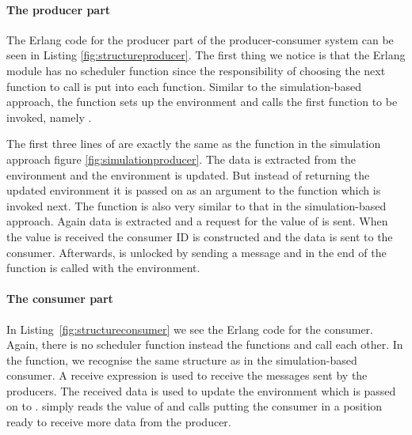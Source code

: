 \paragraph{The producer part}
The Erlang code for the producer part of the producer-consumer system can be seen in Listing \ref{fig:structureproducer}. The first thing we notice is that the Erlang module has no scheduler function since the responsibility of choosing the next function to call is put into each function. Similar to the simulation-based approach, the  function sets up the environment and calls the first function to be invoked, namely .



The first three lines of  are exactly the same as the  function in the simulation approach figure \ref{fig:simulationproducer}. The data is extracted from the environment and the environment is updated. But instead of returning the updated environment it is passed on as an argument to the  function which is invoked next. The  function is also very similar to that in the simulation-based approach. Again data is extracted and a request for the value of  is sent. When the value is received the consumer ID is constructed and the data is sent to the consumer. Afterwards,  is unlocked by sending a  message and in the end of the function  is called with the environment.

\paragraph{The consumer part}
In Listing~\ref{fig:structureconsumer} we see the Erlang code for the consumer. Again, there is no scheduler function instead the functions  and  call each other. In the  function, we recognise the same structure as in the simulation-based consumer. A receive expression is used to receive the messages sent by the producers. The received data is used to update the environment which is passed on to .  simply reads the value of  and calls  putting the consumer in a position ready to receive more data from the producer.



